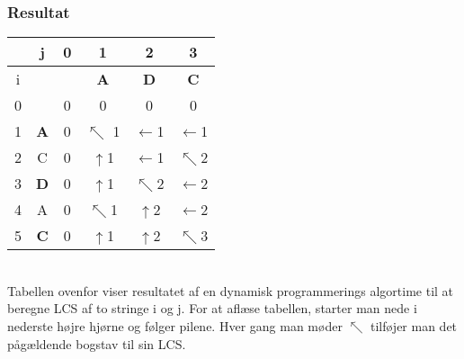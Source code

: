 \documentclass[12pt]{article}
\begin{document}
\subsubsection*{Resultat}
\begin{tabular}{ c|c|c|c|c|c}
  &j&0&1&2&3\\ \hline
  i&&&\textbf{A}&\textbf{D}&\textbf{C}\\ \hline
  0&&0&0&0&0\\ \hline
  1&\textbf{A}&0&$\nwarrow$ 1&$\leftarrow$1&$\leftarrow$1\\ \hline
  2&C&0&$\uparrow$1&$\leftarrow$1&$\nwarrow$2\\ \hline
  3&\textbf{D}&0&$\uparrow$1&$\nwarrow$2&$\leftarrow$2\\ \hline
  4&A&0&$\nwarrow$1&$\uparrow$2&$\leftarrow$2\\ \hline
  5&\textbf{C}&0&$\uparrow$1&$\uparrow$2&$\nwarrow$3\\
\end{tabular}\\
Tabellen ovenfor viser resultatet af en dynamisk programmerings algortime til at beregne LCS af to stringe i og j.
For at aflæse tabellen, starter man nede i nederste højre hjørne og følger pilene. Hver gang man møder $\nwarrow$ tilføjer man det pågældende bogstav til sin LCS.
\end{document}
